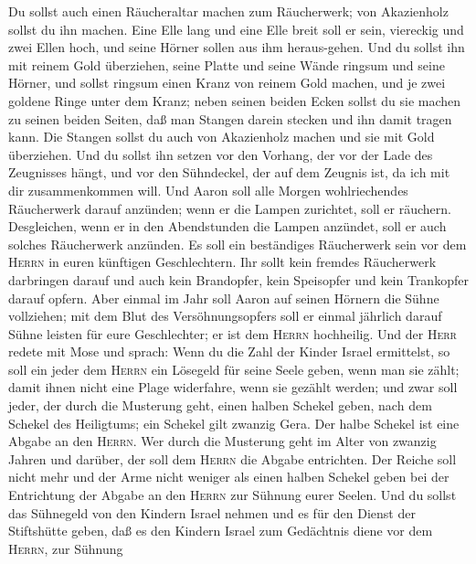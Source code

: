  Du sollst auch einen Räucheraltar machen zum Räucherwerk;
von Akazienholz sollst du ihn machen.  Eine Elle lang und
eine Elle breit soll er sein, viereckig und zwei Ellen hoch, und seine
Hörner sollen aus ihm heraus-gehen.  Und du sollst ihn mit
reinem Gold überziehen, seine Platte und seine Wände ringsum und seine
Hörner, und sollst ringsum einen Kranz von reinem Gold machen,
 und je zwei goldene Ringe unter dem Kranz; neben seinen
beiden Ecken sollst du sie machen zu seinen beiden Seiten, daß man
Stangen darein stecken und ihn damit tragen kann.  Die
Stangen sollst du auch von Akazienholz machen und sie mit Gold
überziehen.  Und du sollst ihn setzen vor den Vorhang, der
vor der Lade des Zeugnisses hängt, und vor den Sühndeckel, der auf dem
Zeugnis ist, da ich mit dir zusammenkommen will.  Und
Aaron soll alle Morgen wohlriechendes Räucherwerk darauf anzünden; wenn
er die Lampen zurichtet, soll er räuchern.  Desgleichen,
wenn er in den Abendstunden die Lampen anzündet, soll er auch solches
Räucherwerk anzünden. Es soll ein beständiges Räucherwerk sein vor dem
\textsc{Herrn} in euren künftigen Geschlechtern.  Ihr
sollt kein fremdes Räucherwerk darbringen darauf und auch kein
Brandopfer, kein Speisopfer und kein Trankopfer darauf opfern.
 Aber einmal im Jahr soll Aaron auf seinen Hörnern die
Sühne vollziehen; mit dem Blut des Versöhnungsopfers soll er einmal
jährlich darauf Sühne leisten für eure Geschlechter; er ist dem
\textsc{Herrn} hochheilig.  Und der \textsc{Herr} redete
mit Mose und sprach:  Wenn du die Zahl der Kinder Israel
ermittelst, so soll ein jeder dem \textsc{Herrn} ein Lösegeld für seine
Seele geben, wenn man sie zählt; damit ihnen nicht eine Plage
widerfahre, wenn sie gezählt werden;  und zwar soll
jeder, der durch die Musterung geht, einen halben Schekel geben, nach
dem Schekel des Heiligtums; ein Schekel gilt zwanzig Gera. Der halbe
Schekel ist eine Abgabe an den \textsc{Herrn}.  Wer durch
die Musterung geht im Alter von zwanzig Jahren und darüber, der soll dem
\textsc{Herrn} die Abgabe entrichten.  Der Reiche soll
nicht mehr und der Arme nicht weniger als einen halben Schekel geben bei
der Entrichtung der Abgabe an den \textsc{Herrn} zur Sühnung eurer
Seelen.  Und du sollst das Sühnegeld von den Kindern
Israel nehmen und es für den Dienst der Stiftshütte geben, daß es den
Kindern Israel zum Gedächtnis diene vor dem \textsc{Herrn}, zur Sühnung
